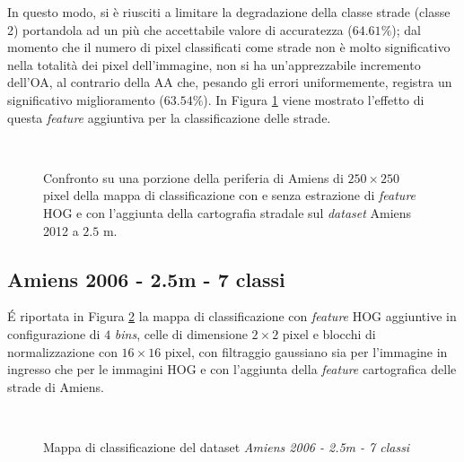  In questo modo, si è riusciti a limitare la degradazione della classe strade (classe 2) portandola ad un più che accettabile valore di accuratezza ($64.61\%$); dal momento che il numero di pixel classificati come strade non è molto significativo nella totalità dei pixel dell'immagine, non si ha un'apprezzabile incremento dell'OA, al contrario della AA che, pesando gli errori uniformemente, registra un significativo miglioramento ($63.54\%$).
In Figura \ref{fig:confrontoAmiens2012_2_5m} viene mostrato l'effetto di questa \emph{feature} aggiuntiva per la classificazione delle strade.
 \begin{figure}[!ht]
\center 
   \hspace{3mm}
      \\
    \caption{Confronto su una porzione della periferia di Amiens di $250\times250$ pixel della mappa di classificazione con e senza estrazione di \emph{feature} HOG e con l'aggiunta della cartografia stradale sul \emph{dataset} Amiens 2012 a $2.5$ m. }
    \label{fig:confrontoAmiens2012_2_5m}
  \end{figure}
  \clearpage
  

\subsection{Amiens 2006 - 2.5m - 7 classi}
\'E riportata in Figura \ref{fig:ClassMap_Amiens2006_2_5m_roadsandhog} la mappa di classificazione con \emph{feature} HOG aggiuntive in configurazione di $4$ \emph{bins}, celle di dimensione $2\times2$ pixel e blocchi di normalizzazione con $16\times16$ pixel, con filtraggio gaussiano sia per l'immagine in ingresso che per le immagini HOG e con l'aggiunta della \emph{feature} cartografica delle strade di Amiens.

\begin{figure}[!ht]
 \center
      \\
     
    \caption{Mappa di classificazione del dataset \emph{Amiens 2006 - 2.5m - 7 classi}}
    \label{fig:ClassMap_Amiens2006_2_5m_roadsandhog}
  \end{figure} 


